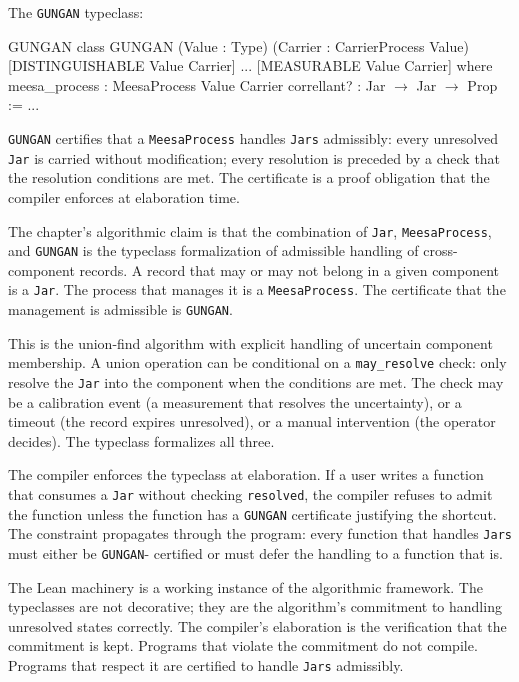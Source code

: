 The \texttt{GUNGAN} typeclass:

\begin{leanexcerpt}{GUNGAN}
class GUNGAN
    (Value : Type)
    (Carrier : CarrierProcess Value)
    [DISTINGUISHABLE Value Carrier] ... [MEASURABLE Value Carrier]
  where
  meesa_process : MeesaProcess Value Carrier
  correllant?   : Jar $\to$ Jar $\to$ Prop := ...
\end{leanexcerpt}

\texttt{GUNGAN} certifies that a \texttt{MeesaProcess} handles
\texttt{Jars} admissibly: every unresolved \texttt{Jar} is carried
without modification; every resolution is preceded by a check that the
resolution conditions are met. The certificate is a proof obligation
that the compiler enforces at elaboration time.

The chapter's algorithmic claim is that the combination of \texttt{Jar},
\texttt{MeesaProcess}, and \texttt{GUNGAN} is the typeclass formalization
of admissible handling of cross-component records. A record that may or
may not belong in a given component is a \texttt{Jar}. The process that
manages it is a \texttt{MeesaProcess}. The certificate that the
management is admissible is \texttt{GUNGAN}.

This is the union-find algorithm with explicit handling of uncertain
component membership. A union operation can be conditional on a
\texttt{may\_resolve} check: only resolve the \texttt{Jar} into the
component when the conditions are met. The check may be a calibration
event (a measurement that resolves the uncertainty), or a timeout (the
record expires unresolved), or a manual intervention (the operator
decides). The typeclass formalizes all three.

The compiler enforces the typeclass at elaboration. If a user writes
a function that consumes a \texttt{Jar} without checking
\texttt{resolved}, the compiler refuses to admit the function unless
the function has a \texttt{GUNGAN} certificate justifying the
shortcut. The constraint propagates through the program: every
function that handles \texttt{Jars} must either be \texttt{GUNGAN}-
certified or must defer the handling to a function that is.

The Lean machinery is a working instance of the algorithmic
framework. The typeclasses are not decorative; they are the
algorithm's commitment to handling unresolved states correctly. The
compiler's elaboration is the verification that the commitment is
kept. Programs that violate the commitment do not compile. Programs
that respect it are certified to handle \texttt{Jars} admissibly.

